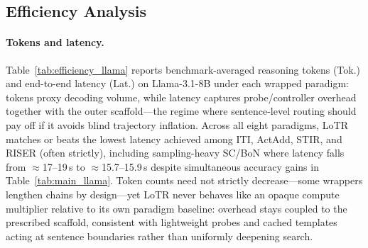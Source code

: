 \begin{table}[t]
{\begin{tabular}{lccccccccc}
    \bottomrule
\end{tabular}%
}
\vspace{-6mm}
\end{table}

\vspace{-1mm}
\subsection{Efficiency Analysis}
\label{sec:efficiency}

\paragraph{Tokens and latency.}
Table~\ref{tab:efficiency_llama} reports benchmark-averaged reasoning tokens (Tok.) and end-to-end latency (Lat.) on Llama-3.1-8B under each wrapped paradigm: tokens proxy decoding volume, while latency captures probe/controller overhead together with the outer scaffold---the regime where sentence-level routing should pay off if it avoids blind trajectory inflation.
Across all eight paradigms, LoTR matches or beats the lowest latency achieved among ITI, ActAdd, STIR, and RISER (often strictly), including sampling-heavy SC/BoN where latency falls from \(\approx\)17--19\,s to \(\approx\)15.7--15.9\,s despite simultaneous accuracy gains in Table~\ref{tab:main_llama}.
Token counts need not strictly decrease---some wrappers lengthen chains by design---yet LoTR never behaves like an opaque compute multiplier relative to its own paradigm baseline: overhead stays coupled to the prescribed scaffold, consistent with lightweight probes and cached templates acting at sentence boundaries rather than uniformly deepening search.

